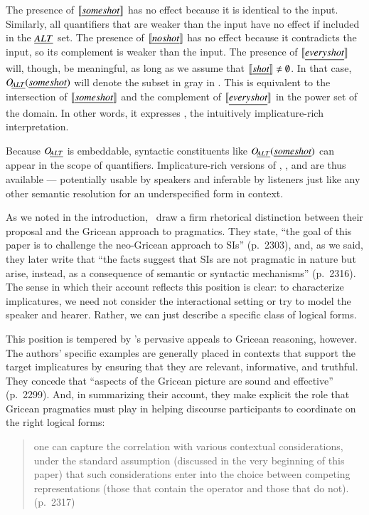\documentclass[leqno,12pt]{article}
\begin{document}
The presence of $\llbracket\emph{some shot\/}\rrbracket$ has no effect because it is
identical to the input. Similarly, all quantifiers that are weaker
than the input have no effect if included in the $\emph{ALT}$ set. The
presence of $\llbracket\emph{no shot\/}\rrbracket$ has no effect because it
contradicts the input, so its complement is weaker than the input.
The presence of $\llbracket\emph{every shot\/}\rrbracket$ will, though, be meaningful,
as long as we assume that $\llbracket\emph{shot\/}\rrbracket \neq \emptyset$.  In that
case, $\mathop{O\negthinspace_{\emph{ALT}}}(\emph{some shot\/})$ will denote the subset in gray in
.  This is equivalent to the intersection of
$\llbracket\emph{some shot\/}\rrbracket$ and the complement of
$\llbracket\emph{every shot\/}\rrbracket$ in the power set of the domain.  In other
words, it expresses , the intuitively
implicature-rich interpretation.

Because $\mathop{O\negthinspace_{\emph{ALT}}}$ is embeddable, syntactic constituents like
$\mathop{O\negthinspace_{\emph{ALT}}}(\emph{some shot})$ can appear in the scope of quantifiers.
Implicature-rich versions of , , and
 are thus available --- potentially usable by
speakers and inferable by listeners just like any other semantic
resolution for an underspecified form in context.

As we noted in the introduction, \CFS\ draw a firm rhetorical
distinction between their proposal and the Gricean approach to
pragmatics. They state, ``the goal of this paper is to challenge the
neo-Gricean approach to SIs'' (p.~2303), and, as we said, they later
write that ``the facts suggest that SIs are not pragmatic in nature
but arise, instead, as a consequence of semantic or syntactic
mechanisms'' (p.~2316). The sense in which their account reflects this
position is clear: to characterize implicatures, we need not consider
the interactional setting or try to model the speaker and
hearer. Rather, we can just describe a specific class of logical
forms.

This position is tempered by \CFS's pervasive appeals to
Gricean reasoning, however.  The authors' specific examples are generally
placed in contexts that support the target implicatures by ensuring
that they are relevant, informative, and truthful.  They concede that
``aspects of the Gricean picture are sound and effective''
(p.~2299). And, in summarizing their account, they make explicit the
role that Gricean pragmatics must play in helping discourse
participants to coordinate on the right logical forms:
%
\begin{quote}
  one can capture the correlation with various contextual
  considerations, under the standard assumption (discussed in the very
  beginning of this paper) that such considerations enter into the
  choice between competing representations (those that contain the
  operator and those that do not). (p.~2317)
\end{quote}
\end{document}
